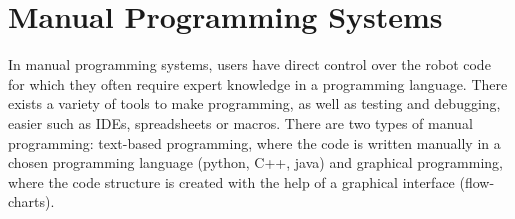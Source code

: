 
\section{Manual Programming Systems}\label{subsec:Manual Programming Systems}
In manual programming systems, users have direct control over the robot code
for which they often require expert knowledge in a programming language. %
There exists a variety of tools to make programming, as well as testing and debugging, easier such as IDEs, spreadsheets or macros. 
There are two types of manual programming: text-based programming, where the code is written manually in a chosen programming language (\eg python, C++, java) and graphical programming, where the code structure is created with the help of a graphical interface (\eg flow-charts). 

